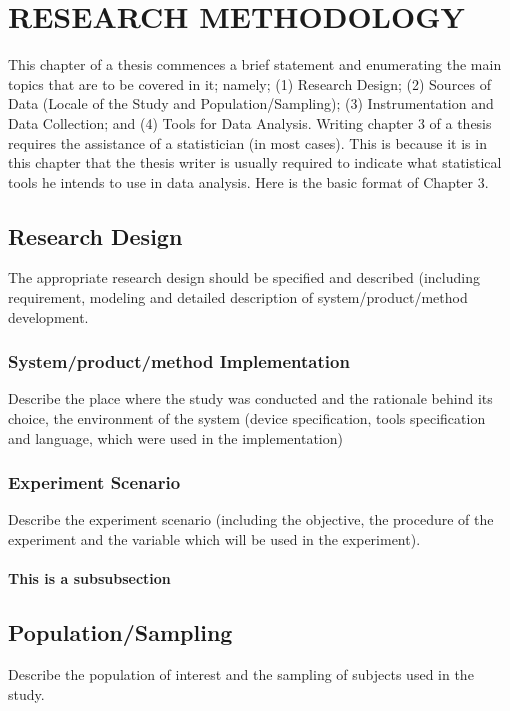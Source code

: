 \chapter{RESEARCH METHODOLOGY}
This chapter of a thesis commences a brief statement and enumerating the main topics that are to be covered in it; namely; (1) Research Design; (2) Sources of Data (Locale of the Study and Population/Sampling); (3) Instrumentation and Data Collection; and (4) Tools for Data Analysis. Writing chapter 3 of a thesis requires the assistance of a statistician (in most cases). This is because it is in this chapter that the thesis writer is usually required to indicate what statistical tools he intends to use in data analysis. Here is the basic format of Chapter 3. 

\section{Research Design}
The appropriate research design should be specified and described (including requirement, modeling and detailed description of system/product/method development.
\subsection{System/product/method Implementation}
Describe the place where the study was conducted and the rationale behind its choice, the environment of the system (device specification, tools specification and language, which were used in the implementation)
\subsection{Experiment Scenario}
Describe the experiment scenario (including the objective, the procedure of the experiment and the variable which will be used in the experiment).
\subsubsection{This is a subsubsection}

\section{Population/Sampling}
Describe the population of interest and the sampling of subjects used in the study.

